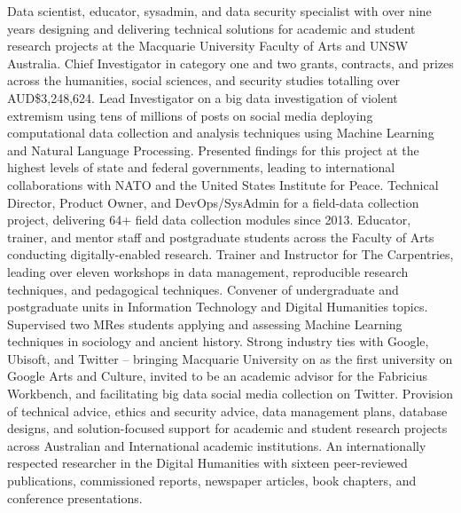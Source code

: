 
Data scientist, educator, sysadmin, and data security specialist with over nine years designing and delivering technical solutions for academic and student research projects at the Macquarie University Faculty of Arts and UNSW Australia. Chief Investigator in category one and two grants, contracts, and prizes across the humanities, social sciences, and security studies totalling over AUD\$3,248,624. Lead Investigator on a big data investigation of violent extremism using tens of millions of posts on social media deploying computational data collection and analysis techniques using Machine Learning and Natural Language Processing. Presented findings for this project at the highest levels of state and federal governments, leading to international collaborations with NATO and the United States Institute for Peace. Technical Director, Product Owner, and DevOps/SysAdmin for a field-data collection project, delivering 64+ field data collection modules since 2013. Educator, trainer, and mentor staff and postgraduate students across the Faculty of Arts conducting digitally-enabled research. Trainer and Instructor for The Carpentries, leading over eleven workshops in data management, reproducible research techniques, and pedagogical techniques. Convener of undergraduate and postgraduate units in Information Technology and Digital Humanities topics. Supervised two MRes students applying and assessing Machine Learning techniques in sociology and ancient history. Strong industry ties with Google, Ubisoft, and Twitter -- bringing Macquarie University on as the first university on Google Arts and Culture, invited to be an academic advisor for the Fabricius Workbench, and facilitating big data social media collection on Twitter. Provision of technical advice, ethics and security advice, data management plans, database designs, and solution-focused support for academic and student research projects across Australian and International academic institutions. An internationally respected researcher in the Digital Humanities with sixteen peer-reviewed publications, commissioned reports, newspaper articles, book chapters, and conference presentations.



